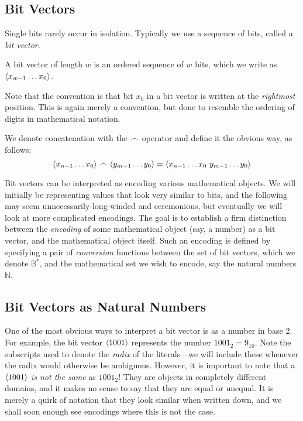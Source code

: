 \subsection{Bit Vectors}

Single bits rarely occur in isolation.  Typically we use a sequence of
bits, called a \emph{bit vector}.

\begin{definition}
  A bit vector of length $w$ is an ordered sequence of $w$ bits, which
  we write as $\langle x_{w-1}\ldots{}x_{0} \rangle$.
\end{definition}

Note that the convention is that bit $x_{0}$ in a bit vector is
written at the \emph{rightmost} position.  This is again merely a
convention, but done to resemble the ordering of digits in
mathematical notation.

\begin{definition}
  We denote concatenation with the $\frown$ operator and define it
  the obvious way, as follows:
  \[
    \langle x_{n-1}\ldots{}x_{0} \rangle \frown \langle y_{m-1}\ldots{}y_{0} \rangle =
    \langle x_{n-1}\ldots{}x_{0}~y_{m-1}\ldots{}y_{0} \rangle
  \]
\end{definition}


Bit vectors can be interpreted as encoding various mathematical
objects.  We will initially be representing values that look very
similar to bits, and the following may seem unnecessarily long-winded
and ceremonious, but eventually we will look at more complicated
encodings.  The goal is to establish a firm distinction between the
\emph{encoding} of some mathematical object (say, a number) as a bit
vector, and the mathematical object itself.  Such an encoding is
defined by specifying a pair of \emph{conversion} functions between
the set of bit vectors, which we denote $\mathbb{B}^{*}$, and the
mathematical set we wish to encode, say the natural numbers
$\mathbb{N}$.

\subsection{Bit Vectors as Natural Numbers}
\label{sec:bitnats}

One of the most obvious ways to interpret a bit vector is as a number
in base 2.  For example, the bit vector $\langle 1001 \rangle$ represents
the number $1001_{2} = 9_{10}$.  Note the subscripts used to denote
the \emph{radix} of the literals---we will include these whenever the
radix would otherwise be ambiguous.  However, it is important to note
that a $\langle 1001 \rangle$ \emph{is not the same} as $1001_{2}$!  They
are objects in completely different domains, and it makes no sense to
say that they are equal or unequal.  It is merely a quirk of notation
that they look similar when written down, and we shall soon enough see
encodings where this is not the case.

